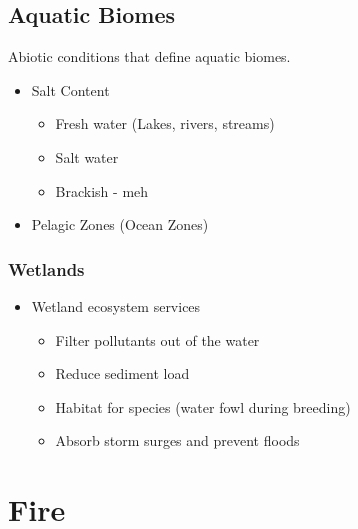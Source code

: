 \documentclass[12pt]{article}
\begin{document}
\subsection{Aquatic Biomes}

Abiotic conditions that define aquatic biomes.
\begin{itemize}
    \item Salt Content
          \begin{itemize}
              \item Fresh water (Lakes, rivers, streams)
              \item Salt water
              \item Brackish - meh
          \end{itemize}
    \item Pelagic Zones (Ocean Zones)
\end{itemize}

\subsubsection{Wetlands}

\begin{itemize}
    \item Wetland ecosystem services
          \begin{itemize}
              \item Filter pollutants out of the water
              \item Reduce sediment load
              \item Habitat for species (water fowl during breeding)
              \item Absorb storm surges and prevent floods
          \end{itemize}
\end{itemize}

\section{Fire}
\end{document}
